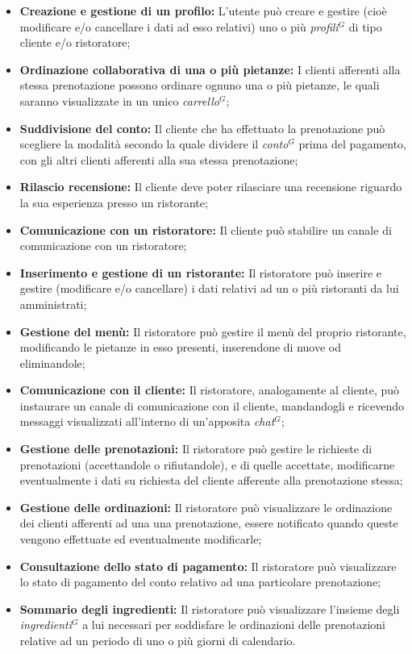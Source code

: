 \begin{itemize}
    \item \textbf{Creazione e gestione di un profilo:} L'utente può creare e gestire (cioè modificare e/o
      cancellare i dati ad esso relativi) uno o più \emph{profili}$^{G}$ di tipo cliente e/o ristoratore;
    \item \textbf{Ordinazione collaborativa di una o più pietanze:} I clienti afferenti alla stessa prenotazione
      possono ordinare ognuno una o più pietanze, le quali saranno visualizzate in un unico \emph{carrello}$^{G}$;
    \item \textbf{Suddivisione del conto:} Il cliente che ha effettuato la prenotazione può scegliere la modalità secondo la quale
      dividere il \emph{conto}$^{G}$ prima del pagamento, con gli altri clienti afferenti alla sua stessa prenotazione;
    \item \textbf{Rilascio recensione:} Il cliente deve poter rilasciare una recensione riguardo la sua esperienza presso un ristorante;
    \item \textbf{Comunicazione con un ristoratore:} Il cliente può stabilire un canale di comunicazione con un ristoratore;
    \item \textbf{Inserimento e gestione di un ristorante:} Il ristoratore può inserire e gestire (modificare e/o cancellare) i dati relativi ad un o più ristoranti da lui amministrati;
    \item \textbf{Gestione del menù:} Il ristoratore può gestire il menù del proprio ristorante, modificando le pietanze in esso presenti, inserendone di nuove od eliminandole;
    \item \textbf{Comunicazione con il cliente:} Il ristoratore, analogamente al cliente, può instaurare un canale di comunicazione
      con il cliente, mandandogli e ricevendo messaggi visualizzati all'interno di un'apposita \emph{chat}$^{G}$;
    \item \textbf{Gestione delle prenotazioni:} Il ristoratore può gestire le richieste di prenotazioni (accettandole o rifiutandole), e di quelle accettate, modificarne eventualmente i dati su richiesta del cliente afferente alla prenotazione stessa;
    \item \textbf{Gestione delle ordinazioni:} Il ristoratore può visualizzare le ordinazione dei clienti afferenti ad una una prenotazione, essere notificato quando queste vengono effettuate ed eventualmente modificarle;
    \item \textbf{Consultazione dello stato di pagamento:} Il ristoratore può visualizzare lo stato di pagamento del conto relativo ad una particolare prenotazione;
  \item \textbf{Sommario degli ingredienti:} Il ristoratore può visualizzare l'insieme degli \emph{ingredienti}$^{G}$ a lui necessari per soddisfare le ordinazioni delle prenotazioni relative ad un periodo di uno o più giorni di calendario.
\end{itemize}
